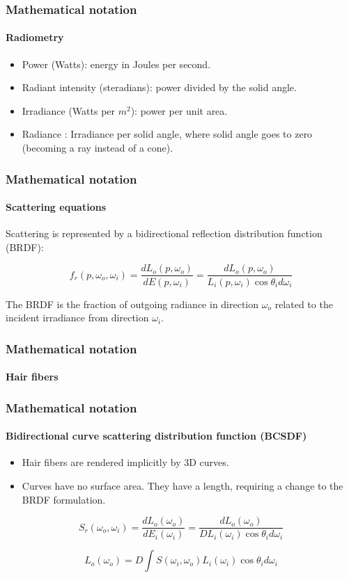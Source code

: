 \documentclass{beamer}
\begin{document}
  
  \begin{frame}
    \frametitle{Mathematical notation}
	\framesubtitle{Radiometry}
	\begin{itemize}
	\item Power (Watts): energy in Joules per second.
	\item Radiant intensity (steradians): power divided by the solid angle.
	\item Irradiance (Watts per $m^2$): power per unit area.
	\item Radiance : Irradiance per solid angle, where solid angle goes to zero (becoming a ray instead of a cone).
	\end{itemize}
  \end{frame}
  
  \begin{frame}
    \frametitle{Mathematical notation}
	\framesubtitle{Scattering equations}
	
	Scattering is represented by a bidirectional reflection distribution function (BRDF):
	
	\begin{equation}
	f_r(p, \omega_o, \omega_i) = \frac{dL_o(p, \omega_o)}{dE(p, \omega_i)} = \frac{dL_o(p, \omega_o)}{L_i(p, \omega_i) \cos \theta_i d\omega_i}
	\end{equation}
	
	The BRDF is the fraction of outgoing radiance in direction $\omega_o$ related to the incident irradiance from direction $\omega_i$.

  \end{frame}
  
  \begin{frame}
    \frametitle{Mathematical notation}
	\framesubtitle{Hair fibers}
	
	
	
  \end{frame}
  
  
\begin{frame}
    \frametitle{Mathematical notation}
	\framesubtitle{Bidirectional curve scattering distribution function (BCSDF)}
	
	\begin{itemize}
	\item Hair fibers are rendered implicitly by 3D curves.
	\item Curves have no surface area. They have a length, requiring a change to the BRDF formulation.
	\end{itemize}
	
	\begin{equation}
	S_r(\omega_o, \omega_i) = \frac{dL_o(\omega_o)}{dE_i(\omega_i)} = \frac{dL_o(\omega_o)}{DL_i(\omega_i) \cos \theta_i d\omega_i}
	\end{equation}
	
	\begin{equation}
	L_o(\omega_o) = D \int S(\omega_i, \omega_o) L_i(\omega_i) \cos \theta_i d\omega_i
	\end{equation}

  \end{frame}  
  
\end{document}
